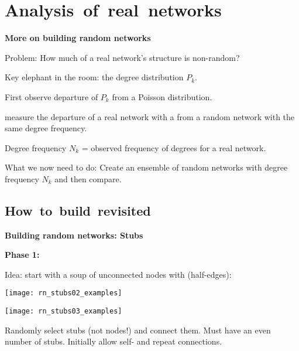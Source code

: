 \section{Analysis\ of\ real\ networks}

\begin{frame}[label=]
  \textbf{More on building random networks}

  
   
    \alert{Problem:} 
    How much of a real network's structure is non-random?
   
    Key elephant in the room: the \alert{degree distribution} $P_k$.
   
    First observe \alert{departure} of $P_k$ from a Poisson distribution.
  
    measure the departure of a real network 
    with a 
    from a random
    network with the same degree frequency.
  
    Degree frequency $N_k$ = observed frequency of degrees for a real network.
   
    \alert{What we now need to do}: 
    Create an ensemble of random networks
    with degree frequency $N_k$ and then compare.
  


\subsection{How\ to\ build\ revisited}

\begin{frame}[label=]
  \textbf{Building random networks: Stubs}

  \textbf{Phase 1:}
    
     \alert{Idea:} start with a soup of unconnected nodes
      with  (half-edges):
      \begin{center}
        \texttt{[image: rn\_stubs02\_examples]}
      \end{center}
    
          
      \texttt{[image: rn\_stubs03\_examples]}
      
      
       Randomly select stubs (not nodes!) and connect them.
       Must have an even number of stubs.
       Initially allow \alert{self-} and \alert{repeat} connections.
      
    
  





\end{frame}
\end{frame}
